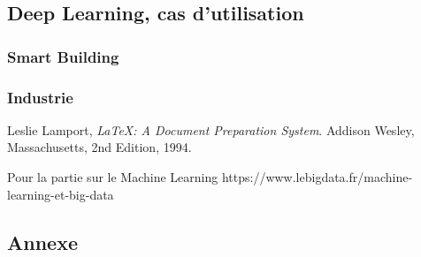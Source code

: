 \documentclass[12pt,a4paper]{report}
\begin{document}
\section{Deep Learning, cas d'utilisation}

\subsection{Smart Building}

\subsection{Industrie}




\begin{thebibliography}{9}

	  Leslie Lamport,
	  \emph{\LaTeX: A Document Preparation System}.
	  Addison Wesley, Massachusetts,
	  2nd Edition,
	  1994.
	  
	Pour la partie sur le Machine Learning https://www.lebigdata.fr/machine-learning-et-big-data

\end{thebibliography}


\label{Pour la partie sur le Machine Learning https://www.lebigdata.fr/machine-learning-et-big-data}

\label{TensorFlow : https://www.lebigdata.fr/tensorflow-definition-tout-savoir}



\label{https://www.youtube.com/watch?v=QR1SnCRungE&ab_channel=AlainOlivetti} 


\begin{appendix}
 \chapter{Annexe}
 
\end{appendix}
\end{document}

